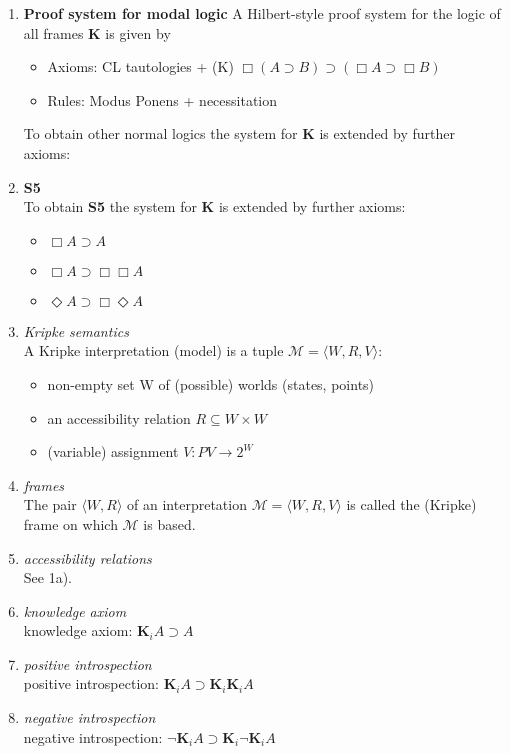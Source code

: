 \documentclass[11pt,a4paper]{article}
\newcommand{\lto}{\supset}
\newcommand{\some}{\Diamond}
\newcommand{\all}{\Box}
\newcommand{\eall}{\mathbf{K}}
\begin{document}
\begin{enumerate}
\begin{enumerate}
\item \textbf{Proof system for modal logic}
A Hilbert-style proof system for the logic of all frames \textbf{K} is given
by 
\begin{itemize}
\item Axioms: CL tautologies + (K) $\all(A \lto B) \lto (\all A \lto \all B)$
\item Rules: Modus Ponens + necessitation
\end{itemize}
To obtain other normal logics the system for \textbf{K} is extended by
further axioms:

\item \textbf{S5} \\
To obtain \textbf{S5} the system for \textbf{K} is extended by
further axioms:
\begin{itemize}
\item $\all A \lto A$
\item $\all A \lto \all \all A $
\item $\some A \lto \all \some A$
\end{itemize}

\item \textit{Kripke semantics} \\
A Kripke interpretation (model) is a tuple $\mathcal{M} = \langle W, R, V\rangle$: 
\begin{itemize}
\item non-empty set W of (possible) worlds (states, points)
\item an accessibility relation $R \subseteq W \times W$
\item (variable) assignment $V : PV \to 2^W$
\end{itemize}

\item \textit{frames} \\
The pair $\langle W, R\rangle$ of an interpretation $\mathcal{M} = \langle W, R, V\rangle$
is called the (Kripke) frame on which $\mathcal{M}$ is based.
\item \textit{accessibility relations} \\
See 1a).


\item \textit{knowledge axiom} \\
knowledge axiom: $\eall_i A \lto A$
\item \textit{positive introspection} \\
positive introspection: $\eall_i A \lto \eall_i \eall_i A$ 
\item \textit{negative introspection} \\
negative introspection: $\neg \eall_i A \lto \eall_i \neg \eall_i A$ 
\end{enumerate}



\end{enumerate}
\end{document}

